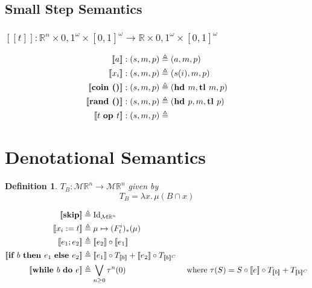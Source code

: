 \documentclass{article}
\newtheorem*{definition}{Definition}
\begin{document}
	\subsection{Small Step Semantics}
	\subsubsection{$[\![t]\!] : \mathbb{R}^n \times {0, 1}^\omega \times [0,1]^\omega \to \mathbb{R} \times {0, 1}^\omega \times [0,1]^\omega $}
	\begin{equation*}
		\begin{split}
			[\![ a ]\!] : (s, m, p) 
			&\triangleq (a, m, p) \\
			[\![ x_i ]\!] : (s, m, p) 
			&\triangleq (s(i), m, p) \\
			[\![ \text{\bf coin ()} ]\!] : (s, m, p) 
			&\triangleq (\text{\bf hd } m, \text{\bf tl } m ,p)\\
			[\![ \text{\bf rand ()} ]\!] : (s, m, p) 
			&\triangleq (\text{\bf hd } p, m, \text{\bf tl } p) \\
			[\![ t \text{ \bf op } t ]\!] : (s, m, p) 
			&\triangleq \\
		\end{split}
	\end{equation*}
	
	\section{Denotational Semantics}
			\begin{definition}
			$T_B : \mathcal{M}\mathbb{R}^n \to \mathcal{M}\mathbb{R}^n$ given by
			\begin{equation*}
				T_B = \lambda x.\, \mu(B \cap x)
			\end{equation*}
		\end{definition}
	
		\begin{equation*}
			\begin{split}
				[\![ {\bf skip} ]\!]
				&\triangleq \text{Id}_{\mathcal{M}\mathbb{R}^n} \\
				[\![ x_i := t]\!]
				&\triangleq \mu \mapsto (F_t^i)_*(\mu) \\
				[\![ e_1; e_2 ]\!]
				&\triangleq [\![e_2]\!] \circ [\![e_1]\!] \\
				[\![ \text{\bf if } b \text{ \bf then } e_1 \text{ \bf else } e_2 ]\!]
				&\triangleq [\![e_1]\!] \circ T_{[\![b]\!]} + [\![e_2]\!] \circ T_{[\![b]\!]^C}\\
				[\![\text{\bf while } b \text{ \bf do } e ]\!] 
				&\triangleq \bigvee_{n \geq 0} \tau^n(0)
				\hspace{1in}\mbox{ where } \tau(S) = S \circ [\![e]\!] \circ T_{[\![b]\!]} + T_{[\![b]\!]^C}\\
			\end{split}
		\end{equation*}
		
\end{document}
